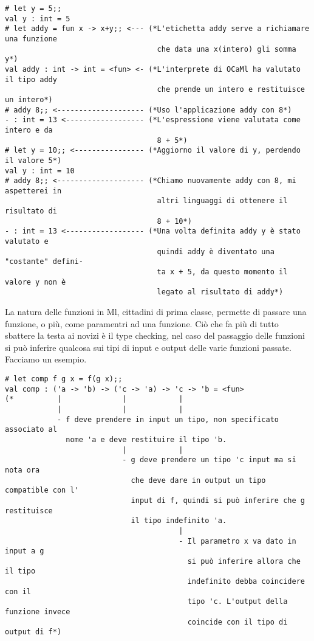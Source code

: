 \documentclass{article}
\begin{document}
\begin{verbatim}
# let y = 5;;
val y : int = 5
# let addy = fun x -> x+y;; <--- (*L'etichetta addy serve a richiamare una funzione
                                   che data una x(intero) gli somma y*)
val addy : int -> int = <fun> <- (*L'interprete di OCaMl ha valutato il tipo addy
                                   che prende un intero e restituisce un intero*)
# addy 8;; <-------------------- (*Uso l'applicazione addy con 8*)
- : int = 13 <------------------ (*L'espressione viene valutata come intero e da
                                   8 + 5*)
# let y = 10;; <---------------- (*Aggiorno il valore di y, perdendo il valore 5*)
val y : int = 10
# addy 8;; <-------------------- (*Chiamo nuovamente addy con 8, mi aspetterei in
                                   altri linguaggi di ottenere il risultato di 
                                   8 + 10*)
- : int = 13 <------------------ (*Una volta definita addy y è stato valutato e 
                                   quindi addy è diventato una "costante" defini-
                                   ta x + 5, da questo momento il valore y non è
                                   legato al risultato di addy*)
\end{verbatim}

\vspace*{0.5cm}

\hspace*{0.5cm}La natura delle funzioni in Ml, cittadini di prima classe, permette di passare una funzione, o più, come paramentri ad una funzione.
Ciò che fa più di tutto sbattere la testa ai novizi è il type checking, nel caso del passaggio delle funzioni si può inferire qualcosa sui tipi di input e output delle varie funzioni passate.\newline
\hspace*{0.5cm}Facciamo un esempio.


\begin{verbatim}
# let comp f g x = f(g x);;
val comp : ('a -> 'b) -> ('c -> 'a) -> 'c -> 'b = <fun>
(*          |              |            |
            |              |            |
            - f deve prendere in input un tipo, non specificato associato al 
              nome 'a e deve restituire il tipo 'b.
                           |            |
                           - g deve prendere un tipo 'c input ma si nota ora
                             che deve dare in output un tipo compatible con l'
                             input di f, quindi si può inferire che g restituisce 
                             il tipo indefinito 'a.
                                        |
                                        - Il parametro x va dato in input a g
                                          si può inferire allora che il tipo 
                                          indefinito debba coincidere con il 
                                          tipo 'c. L'output della funzione invece
                                          coincide con il tipo di output di f*)

\end{verbatim}
\end{document}
